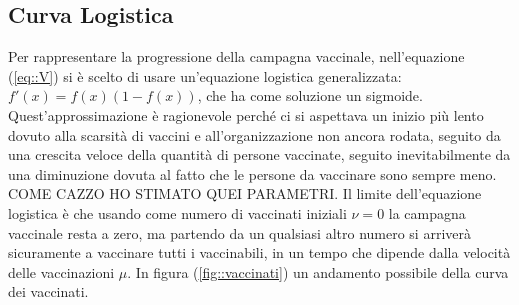 \documentclass{article}
\begin{document}
\subsection{Curva Logistica}
Per rappresentare la progressione della campagna vaccinale, nell'equazione (\ref{eq::V}) si è scelto di usare un'equazione logistica generalizzata: $f'(x)=f(x)(1-f(x))$,
che ha come soluzione un sigmoide. Quest'approssimazione è ragionevole perché ci si aspettava un inizio più lento dovuto alla scarsità di vaccini e all'organizzazione non ancora rodata, seguito da una crescita veloce della quantità di persone vaccinate, seguito inevitabilmente da una diminuzione dovuta al fatto che le persone da vaccinare sono sempre meno. COME CAZZO HO STIMATO QUEI PARAMETRI.
Il limite dell'equazione logistica è che usando come numero di vaccinati iniziali $\nu = 0$ la campagna vaccinale resta a zero, ma partendo da un qualsiasi altro numero si arriverà sicuramente a vaccinare tutti i vaccinabili, in un tempo che dipende dalla velocità delle vaccinazioni $\mu$. In figura (\ref{fig::vaccinati}) un andamento possibile della curva dei vaccinati.\\
\end{document}
